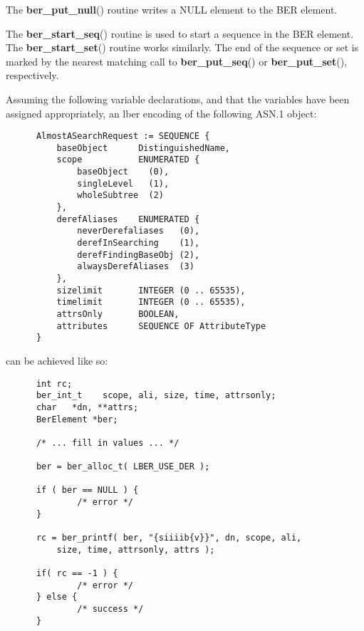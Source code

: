 \documentclass[]{article}
\let\realtextbf=\textbf
\renewcommand{\textbf}[1]{\textcolor{boldcolor}{\realtextbf{#1}}}
\begin{document}
The \textbf{ber\_put\_null}() routine writes a NULL element to the BER
element.

The \textbf{ber\_start\_seq}() routine is used to start a sequence in
the BER element. The \textbf{ber\_start\_set}() routine works similarly.
The end of the sequence or set is marked by the nearest matching call to
\textbf{ber\_put\_seq}() or \textbf{ber\_put\_set}(), respectively.


Assuming the following variable declarations, and that the variables
have been assigned appropriately, an lber encoding of the following
ASN.1 object:

\begin{verbatim}
      AlmostASearchRequest := SEQUENCE {
          baseObject      DistinguishedName,
          scope           ENUMERATED {
              baseObject    (0),
              singleLevel   (1),
              wholeSubtree  (2)
          },
          derefAliases    ENUMERATED {
              neverDerefaliases   (0),
              derefInSearching    (1),
              derefFindingBaseObj (2),
              alwaysDerefAliases  (3)
          },
          sizelimit       INTEGER (0 .. 65535),
          timelimit       INTEGER (0 .. 65535),
          attrsOnly       BOOLEAN,
          attributes      SEQUENCE OF AttributeType
      }
\end{verbatim}

can be achieved like so:

\begin{verbatim}
      int rc;
      ber_int_t    scope, ali, size, time, attrsonly;
      char   *dn, **attrs;
      BerElement *ber;

      /* ... fill in values ... */

      ber = ber_alloc_t( LBER_USE_DER );

      if ( ber == NULL ) {
              /* error */
      }

      rc = ber_printf( ber, "{siiiib{v}}", dn, scope, ali,
          size, time, attrsonly, attrs );

      if( rc == -1 ) {
              /* error */
      } else {
              /* success */
      }
\end{verbatim}

\end{document}
